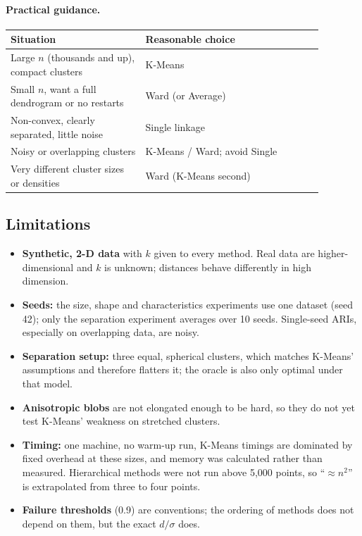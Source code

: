 \documentclass[11pt,letterpaper]{article}
\begin{document}
\paragraph{Practical guidance.}
\begin{center}
\small
\begin{tabular}{p{0.38\linewidth}p{0.5\linewidth}}
\toprule
\textbf{Situation} & \textbf{Reasonable choice} \\
\midrule
Large $n$ (thousands and up), compact clusters & K-Means \\
Small $n$, want a full dendrogram or no restarts & Ward (or Average) \\
Non-convex, clearly separated, little noise & Single linkage \\
Noisy or overlapping clusters & K-Means / Ward; avoid Single \\
Very different cluster sizes or densities & Ward (K-Means second) \\
\bottomrule
\end{tabular}
\end{center}

\subsection{Limitations}

\begin{itemize}
    \item \textbf{Synthetic, 2-D data} with $k$ given to every method. Real
    data are higher-dimensional and $k$ is unknown; distances behave
    differently in high dimension.
    \item \textbf{Seeds:} the size, shape and characteristics experiments
    use one dataset (seed 42); only the separation experiment averages
    over 10 seeds. Single-seed ARIs, especially on overlapping data, are noisy.
    \item \textbf{Separation setup:} three equal, spherical clusters, which
    matches K-Means' assumptions and therefore flatters it; the oracle is also
    only optimal under that model.
    \item \textbf{Anisotropic blobs} are not elongated enough to be hard, so
    they do not yet test K-Means' weakness on stretched clusters.
    \item \textbf{Timing:} one machine, no warm-up run, K-Means timings
    are dominated by fixed overhead at these sizes, and memory was calculated
    rather than measured. Hierarchical methods were not run above 5{,}000
    points, so ``$\approx n^2$'' is extrapolated from three to four points.
    \item \textbf{Failure thresholds} (0.9) are conventions; the
    ordering of methods does not depend on them, but the exact $d/\sigma$ does.
\end{itemize}
\end{document}
